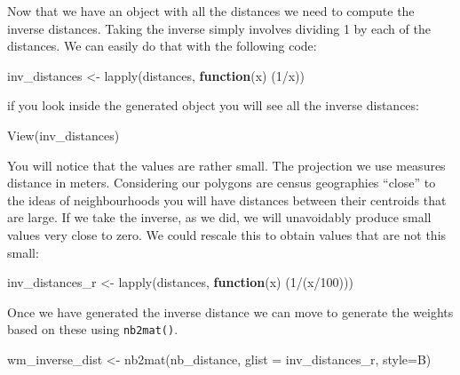 \documentclass[
  krantz2]{krantz}
\makeatletter
\newenvironment{Shaded}{\begin{snugshade}}{\end{snugshade}}
\newcommand{\AttributeTok}[1]{\textcolor[rgb]{0.61,0.61,0.61}{#1}}
\newcommand{\ControlFlowTok}[1]{\textcolor[rgb]{0.27,0.27,0.27}{\textbf{#1}}}
\newcommand{\DecValTok}[1]{\textcolor[rgb]{0.06,0.06,0.06}{#1}}
\newcommand{\FunctionTok}[1]{\textcolor[rgb]{0,0,0}{#1}}
\newcommand{\NormalTok}[1]{#1}
\newcommand{\OtherTok}[1]{\textcolor[rgb]{0.37,0.37,0.37}{#1}}
\newcommand{\SpecialCharTok}[1]{\textcolor[rgb]{0,0,0}{#1}}
\newcommand{\StringTok}[1]{\textcolor[rgb]{0.5,0.5,0.5}{#1}}
\newenvironment{kframe}{%
\medskip{}
\setlength{\fboxsep}{.8em}
 \def\at@end@of@kframe{}%
 \ifinner\ifhmode%
  \def\at@end@of@kframe{\end{minipage}}%
  \begin{minipage}{\columnwidth}%
 \fi\fi%
 \def\FrameCommand##1{\hskip\@totalleftmargin \hskip-\fboxsep
 \colorbox{shadecolor}{##1}\hskip-\fboxsep
     \hskip-\linewidth \hskip-\@totalleftmargin \hskip\columnwidth}%
 \MakeFramed {\advance\hsize-\width
   \@totalleftmargin\z@ \linewidth\hsize
   \@setminipage}}%
 {\par\unskip\endMakeFramed%
 \at@end@of@kframe}
\renewenvironment{Shaded}{\begin{kframe}}{\end{kframe}}
\makeatother
\begin{document}
Now that we have an object with all the distances we need to compute the inverse distances. Taking the inverse simply involves dividing 1 by each of the distances. We can easily do that with the following code:

\begin{Shaded}
\begin{Highlighting}[]
\NormalTok{inv\_distances }\OtherTok{\textless{}{-}} \FunctionTok{lapply}\NormalTok{(distances, }\ControlFlowTok{function}\NormalTok{(x) (}\DecValTok{1}\SpecialCharTok{/}\NormalTok{x))}
\end{Highlighting}
\end{Shaded}

if you look inside the generated object you will see all the inverse distances:

\begin{Shaded}
\begin{Highlighting}[]
\FunctionTok{View}\NormalTok{(inv\_distances)}
\end{Highlighting}
\end{Shaded}

You will notice that the values are rather small. The projection we use measures distance in meters. Considering our polygons are census geographies ``close'' to the ideas of neighbourhoods you will have distances between their centroids that are large. If we take the inverse, as we did, we will unavoidably produce small values very close to zero. We could rescale this to obtain values that are not this small:

\begin{Shaded}
\begin{Highlighting}[]
\NormalTok{inv\_distances\_r }\OtherTok{\textless{}{-}} \FunctionTok{lapply}\NormalTok{(distances, }\ControlFlowTok{function}\NormalTok{(x) (}\DecValTok{1}\SpecialCharTok{/}\NormalTok{(x}\SpecialCharTok{/}\DecValTok{100}\NormalTok{)))}
\end{Highlighting}
\end{Shaded}

Once we have generated the inverse distance we can move to generate the weights based on these using \texttt{nb2mat()}.

\begin{Shaded}
\begin{Highlighting}[]
\NormalTok{wm\_inverse\_dist }\OtherTok{\textless{}{-}} \FunctionTok{nb2mat}\NormalTok{(nb\_distance,}
                \AttributeTok{glist =}\NormalTok{ inv\_distances\_r,}
                \AttributeTok{style=}\StringTok{\textquotesingle{}B\textquotesingle{}}\NormalTok{)}
\end{Highlighting}
\end{Shaded}
\end{document}
